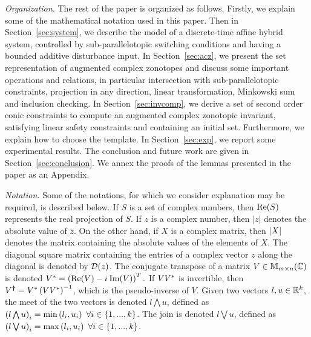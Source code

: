 \emph{Organization.}  The rest of the paper is organized as follows.  Firstly, we explain
some of the mathematical notation used in this paper.  Then in
Section~\ref{sec:system}, we describe the model of a discrete-time
affine hybrid system, controlled by sub-parallelotopic switching
conditions and having a bounded additive disturbance input. In
Section~\ref{sec:acz}, we present the set representation of augmented
complex zonotopes and discuss some important operations and relations, in particular intersection with sub-parallelotopic constraints, projection in any direction, linear transformation, Minkowski sum and inclusion checking.  In
Section~\ref{sec:invcomp}, we derive a set of second order conic
constraints to compute an augmented complex zonotopic invariant,
satisfying linear safety constraints and containing an initial set.
Furthermore, we explain how to choose the template.  In
Section~\ref{sec:exp}, we report some experimental results.  The
conclusion and future work are given in Section~\ref{sec:conclusion}.
We annex the proofs of the lemmas presented in the paper as an
Appendix.

\emph{Notation.} Some of the notations, for which we
consider explanation may be required, is described below.  If $S$ is a
set of complex numbers, then $\operatorname{\operatorname{Re}}(S)$ represents the real projection
of $S$.  If $z$ is a complex number, then $|z|$ denotes the absolute
value of $z$.  On the other hand, if $X$ is a complex matrix, then
$\left|X\right|$ denotes the matrix containing the absolute values of the
elements of $X$.  The diagonal square matrix containing the entries of
a complex vector $z$ along the diagonal is denoted by $\mathcal{D}(z)$.  The
conjugate transpose of a matrix $V\in\mathbb{M}_{m\times n}(\mathbb{\mathbb{C}})$ is
denoted $V^* = \left(\operatorname{\operatorname{Re}}(V)-{i\mkern1mu}\operatorname{\operatorname{Im}}(V)\right)^T.$ If
$VV^*$ is invertible, then
$V^{\bm{\dagger}}= V^*\left(VV^*\right)^{-1}$, which is
the pseudo-inverse of $V$.  Given two vectors $l,u\in\mathbb{R}^k$, the
meet of the two vectors is denoted $l\bigwedge u$, defined as
$\left(l\bigwedge u\right)_i=\min\left(l_i,u_i\right)~\forall i\in\{1,...,k\}$.  The
join is denoted $l\bigvee u$, defined as $\left(l\bigvee
u\right)_i=\max\left(l_i,u_i\right)~\forall i\in\{1,...,k\}$.
